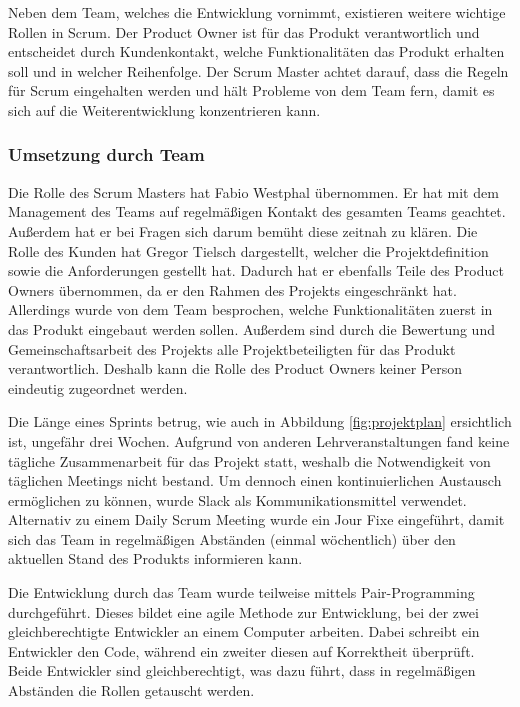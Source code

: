 Neben dem Team, welches die Entwicklung vornimmt, existieren weitere wichtige Rollen in Scrum. Der Product Owner ist für das Produkt verantwortlich und entscheidet durch Kundenkontakt, welche Funktionalitäten das Produkt erhalten soll und in welcher Reihenfolge. Der Scrum Master achtet darauf, dass die Regeln für Scrum eingehalten werden und hält Probleme von dem Team fern, damit es sich auf die Weiterentwicklung konzentrieren kann.  

\subsubsection{Umsetzung durch Team}
Die Rolle des Scrum Masters hat Fabio Westphal übernommen. Er hat mit dem Management des Teams auf regelmäßigen Kontakt des gesamten Teams geachtet. Außerdem hat er bei Fragen sich darum bemüht diese zeitnah zu klären. Die Rolle des Kunden hat Gregor Tielsch dargestellt, welcher die Projektdefinition sowie die Anforderungen gestellt hat. Dadurch hat er ebenfalls Teile des Product Owners übernommen, da er den Rahmen des Projekts eingeschränkt hat. Allerdings wurde von dem Team besprochen, welche Funktionalitäten zuerst in das Produkt eingebaut werden sollen. Außerdem sind durch die Bewertung und Gemeinschaftsarbeit des Projekts alle Projektbeteiligten für das Produkt verantwortlich. Deshalb kann die Rolle des Product Owners keiner Person eindeutig zugeordnet werden.

Die Länge eines Sprints betrug, wie auch in Abbildung \vref{fig:projektplan} ersichtlich ist, ungefähr drei Wochen. Aufgrund von anderen Lehrveranstaltungen fand keine tägliche Zusammenarbeit für das Projekt statt, weshalb die Notwendigkeit von täglichen Meetings nicht bestand. Um dennoch einen kontinuierlichen Austausch ermöglichen zu können, wurde Slack als Kommunikationsmittel verwendet. Alternativ zu einem Daily Scrum Meeting wurde ein Jour Fixe eingeführt, damit sich das Team in regelmäßigen Abständen (einmal wöchentlich) über den aktuellen Stand des Produkts informieren kann. 

Die Entwicklung durch das Team wurde teilweise mittels Pair-Programming durchgeführt. Dieses bildet eine agile Methode zur Entwicklung, bei der zwei gleichberechtigte Entwickler an einem Computer arbeiten. Dabei schreibt ein Entwickler den Code, während ein zweiter diesen auf Korrektheit überprüft. Beide Entwickler sind gleichberechtigt, was dazu führt, dass in regelmäßigen Abständen die Rollen getauscht werden.